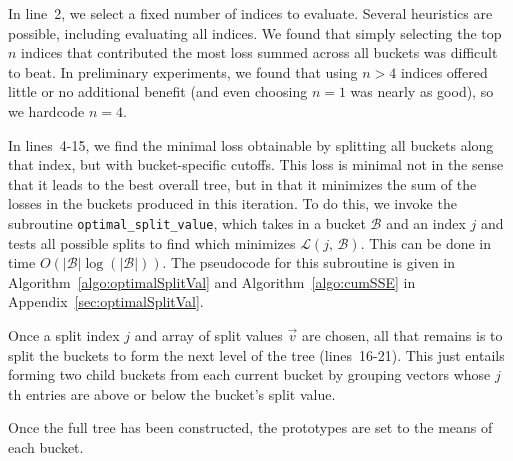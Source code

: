 In line~2, we select a fixed number of indices to evaluate. Several heuristics are possible, including evaluating all indices. We found that simply selecting the top $n$ indices that contributed the most loss summed across all buckets was difficult to beat. In preliminary experiments, we found that using $n > 4$ indices offered little or no additional benefit (and even choosing $n = 1$ was nearly as good), so we hardcode $n = 4$.

In lines~4-15, we find the minimal loss obtainable by splitting all buckets along that index, but with bucket-specific cutoffs. This loss is minimal not in the sense that it leads to the best overall tree, but in that it minimizes the sum of the losses in the buckets produced in this iteration. To do this, we invoke the subroutine \texttt{optimal\_split\_value}, which takes in a bucket $\mathcal{B}$ and an index $j$ and tests all possible splits to find which minimizes $\mathcal{L}(j \text{, } \mathcal{B})$. This can be done in time $O(|\mathcal{B}| \log(|\mathcal{B}|))$. The pseudocode for this subroutine is given in Algorithm~\ref{algo:optimalSplitVal} and Algorithm~\ref{algo:cumSSE} in Appendix~\ref{sec:optimalSplitVal}.

Once a split index $j$ and array of split values $\vec{v}$ are chosen, all that remains is to split the buckets to form the next level of the tree (lines~16-21). This just entails forming two child buckets from each current bucket by grouping vectors whose $j$th entries are above or below the bucket's split value.%

Once the full tree has been constructed, the prototypes are set to the means of each bucket.

